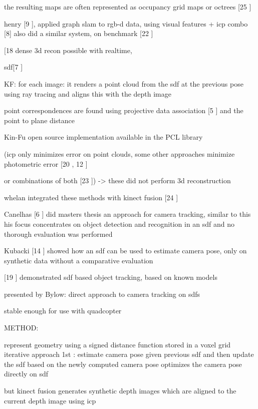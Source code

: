 the resulting maps are often represented as occupancy grid maps or octrees [25 \cite{Wurm10Octomap}]

henry [9 \cite{Henry10Rgb}], applied graph slam to rgb-d data, using visual features + icp combo [8] also did a similar system, on benchmark [22 \cite{Sturm12Benchmark}]

[18 \cite{Newcombe11Kinectfusion} dense 3d recon possible with realtime, 

sdf[7 \cite{Curless96Volumetric}]

KF: for each image:
it renders a point cloud from the sdf at the previous pose using ray tracing and aligns this with the depth image


point correspondences are found using projective data association [5 \cite{Blais95Registering}] and the point to plane distance

Kin-Fu open source implementation available in the PCL library

(icp only minimizes error on point clouds, some other approaches minimize photometric error [20 \cite{Steinbrucker11Real}, 12 \cite{Kerl13Robust}]

or combinations of both [23 \cite{Tykkala11Direct}]) -> these did not perform 3d reconstruction

whelan integrated these methods with kinect fusion [24 \cite{Whelan13Robust}]

Canelhas [6 \cite{Canelhas12Scene}] did masters thesis an approach for camera tracking, similar to this
his focus concentrates on object detection and recognition in an sdf and no thorough evaluation was performed

Kubacki [14 \cite{Kubacki12Registration}] showed how an sdf can be used to estimate camera pose, only on synthetic data without a comparative evaluation

[19 \cite{Ren12Unified}] demonstrated sdf based object tracking, based on known models

presented by Bylow: direct approach to camera tracking on sdfs


stable enough for use with quadcopter

METHOD:

represent geometry using a signed distance function stored in a voxel grid
iterative approach
1st : estimate camera pose given previous sdf and then update the sdf based on the newly computed camera pose
optimizes the camera pose directly on sdf 

but kinect fusion generates synthetic depth images which are aligned to the current depth image using icp

